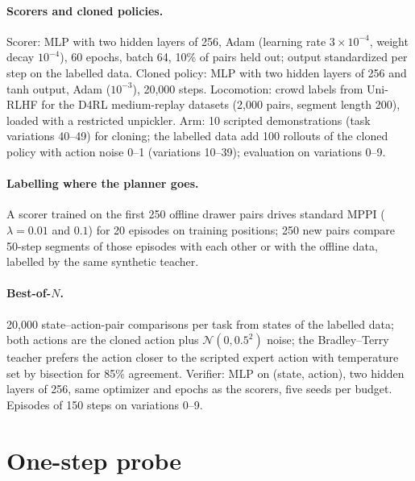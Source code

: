 \documentclass{article}
\theoremstyle{plain}
\theoremstyle{remark}
\begin{document}


\paragraph{Scorers and cloned policies.} Scorer: MLP with two hidden layers of 256, Adam (learning rate $3\times10^{-4}$,
weight decay $10^{-4}$), 60 epochs, batch 64, 10\% of pairs held out; output standardized per step on the labelled data.
Cloned policy: MLP with two hidden layers of 256 and tanh output, Adam ($10^{-3}$), 20,000 steps. Locomotion: crowd labels
from Uni-RLHF for the D4RL medium-replay datasets (2,000 pairs, segment length 200), loaded with a restricted unpickler.
Arm: 10 scripted demonstrations (task variations 40--49) for cloning; the labelled data add 100 rollouts of the cloned
policy with action noise 0--1 (variations 10--39); evaluation on variations 0--9.

\paragraph{Labelling where the planner goes.} A scorer trained on the first 250 offline drawer pairs drives standard
MPPI ($\lambda=0.01$ and $0.1$) for 20 episodes on training positions; 250 new pairs compare 50-step segments of those
episodes with each other or with the offline data, labelled by the same synthetic teacher.

\paragraph{Best-of-$N$.} 20,000 state--action-pair comparisons per task from states of the labelled data; both actions
are the cloned action plus $\mathcal N(0,0.5^2)$ noise; the Bradley--Terry teacher prefers the action closer to the
scripted expert action with temperature set by bisection for 85\% agreement. Verifier: MLP on (state, action), two
hidden layers of 256, same optimizer and epochs as the scorers, five seeds per budget. Episodes of 150 steps on
variations 0--9.

\section{One-step probe}
\label{app:probe}


\end{document}

